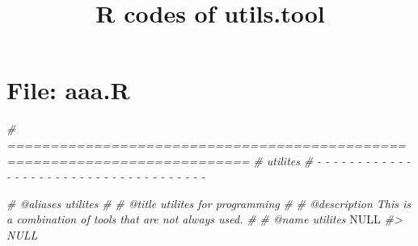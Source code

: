 \documentclass[
]{article}
\title{R codes of utils.tool}
\author{}
\date{\vspace{-2.5em}}
\newenvironment{Shaded}{\begin{snugshade}}{\end{snugshade}}
\newcommand{\CommentTok}[1]{\textcolor[rgb]{0.56,0.35,0.01}{\textit{#1}}}
\newcommand{\ConstantTok}[1]{\textcolor[rgb]{0.00,0.00,0.00}{#1}}
\begin{document}
\maketitle

{
\setcounter{tocdepth}{3}
\tableofcontents
}
\hypertarget{file-aaa.r}{%
\section{File: aaa.R}\label{file-aaa.r}}

\begin{Shaded}
\begin{Highlighting}[]
\CommentTok{\# ==========================================================================}
\CommentTok{\# utilites}
\CommentTok{\# {-} {-} {-} {-} {-} {-} {-} {-} {-} {-} {-} {-} {-} {-} {-} {-} {-} {-} {-} {-} {-} {-} {-} {-} {-} {-} {-} {-} {-} {-} {-} {-} {-} {-} {-} {-} {-}}

\CommentTok{\#\textquotesingle{} @aliases utilites}
\CommentTok{\#\textquotesingle{}}
\CommentTok{\#\textquotesingle{} @title utilites for programming}
\CommentTok{\#\textquotesingle{}}
\CommentTok{\#\textquotesingle{} @description This is a combination of tools that are not always used.}
\CommentTok{\#\textquotesingle{}}
\CommentTok{\#\textquotesingle{} @name utilites}
\ConstantTok{NULL}
\CommentTok{\#\textgreater{} NULL}


\end{Highlighting}
\end{Shaded}
\end{document}
